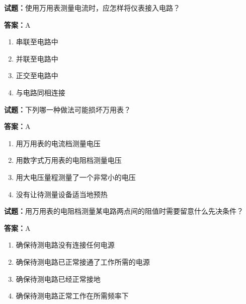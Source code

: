 \documentclass{ctexbook}
\begin{document}




\vspace{1em}

\textbf{试题：}使用万用表测量电流时，应怎样将仪表接入电路？ 

\textbf{答案：}A 

\begin{enumerate}[leftmargin=3em]
  \item 串联至电路中 

  \item 并联至电路中 

  \item 正交至电路中 

  \item 与电路同相连接 

\end{enumerate}





\vspace{1em}

\textbf{试题：}下列哪一种做法可能损坏万用表？ 

\textbf{答案：}A 

\begin{enumerate}[leftmargin=3em]
  \item 用万用表的电流档测量电压 

  \item 用数字式万用表的电阻档测量电压 

  \item 用大电压量程测量了一个非常小的电压 

  \item 没有让待测量设备适当地预热 

\end{enumerate}





\vspace{1em}

\textbf{试题：}用万用表的电阻档测量某电路两点间的阻值时需要留意什么先决条件？ 


\textbf{答案：}A 

\begin{enumerate}[leftmargin=3em]
  \item 确保待测电路没有连接任何电源 

  \item 确保待测电路已正常接通了工作所需的电源 

  \item 确保待测电路已经正常接地 

  \item 确保待测电路正常工作在所需频率下 

\end{enumerate}
\end{document}
